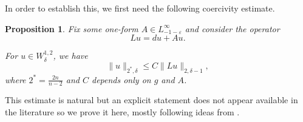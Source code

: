 \documentclass[a4paper,11pt,reqno]{amsart}
\theoremstyle{plain}
\newtheorem{prop}[thm]{Proposition}
\theoremstyle{definition}
\theoremstyle{remark}
\numberwithin{equation}{section}
\begin{document}
In order to establish this, we first need the following coercivity estimate.
\begin{prop}\label{prop-coerce}
	Fix some one-form $A\in L^\infty_{-1-\varepsilon}$ and consider the operator
	\begin{equation*}
		Lu= du+Au.
	\end{equation*}
	
	For $u\in W^{1,2}_{\delta}$, we have
	\begin{equation}\label{eq-coerce}
		\|u\|_{2^*,\delta}\leq C\|Lu\|_{2,\delta-1},
	\end{equation}
	where $2^*=\frac{2n}{n-2}$ and $C$ depends only on $g$ and $A$.
\end{prop}
This estimate is natural but an explicit statement does not appear available in the literature so we prove it here, mostly following ideas from \cite{Bartnik2005PhaseSpace}.
\end{document}
